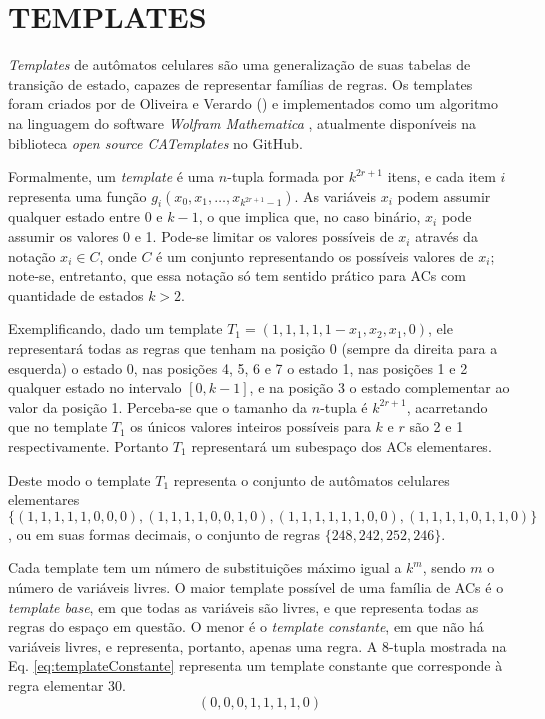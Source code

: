 \section{TEMPLATES}
\label{sec:templates}

\textit{Templates} de autômatos celulares são uma generalização de suas tabelas de transição de estado, capazes de representar famílias de regras. Os templates foram criados por de Oliveira e Verardo (\citeyear{deOliveira2014}) e implementados como um algoritmo na linguagem do software \textit{Wolfram Mathematica} \cite{woframMathematica10}, atualmente disponíveis na biblioteca \textit{open source CATemplates} \cite{CATemplates} no GitHub.

Formalmente, um \textit{template} é uma $n$-tupla formada por $k^{2r+1}$ itens, e cada item $i$ representa uma função $g_i(x_0,x_1,\dots,x_{k^{2r+1}-1})$. As variáveis $x_i$ podem assumir qualquer estado entre 0 e $k-1$, o que implica que, no caso binário, $x_i$ pode assumir os valores 0 e 1. Pode-se limitar os valores possíveis de $x_i$ através da notação $x_i \in C$, onde $C$ é um conjunto representando os possíveis valores de $x_i$; note-se, entretanto, que essa notação só tem sentido prático para ACs com quantidade de estados $k>2$.

Exemplificando, dado um template $T_1 = (1,1,1,1,1-x_1,x_2,x_1,0)$, ele representará todas as regras que tenham na posição 0 (sempre da direita para a esquerda) o estado 0, nas posições 4, 5, 6 e 7 o estado 1, nas posições 1 e 2 qualquer estado no intervalo $[0,k-1]$, e na posição 3 o estado complementar ao valor da posição 1. Perceba-se que o tamanho da $n$-tupla é $k^{2r+1}$, acarretando que no template $T_1$ os únicos valores inteiros possíveis para $k$ e $r$ são 2 e 1 respectivamente. Portanto $T_1$ representará um subespaço dos ACs elementares.

Deste modo o template $T_1$ representa o conjunto de autômatos celulares elementares $\{(1,1,1,1,1,0,0,0),(1,1,1,1,0,0,1,0),(1,1,1,1,1,1,0,0),(1,1,1,1,0,1,1,0)\}$, ou em suas formas decimais, o conjunto de regras $\{248,242,252,246\}$.

Cada template tem um número de substituições máximo igual a $k^m$, sendo $m$ o número de variáveis livres. O maior template possível de uma família de ACs é o \textit{template base}, em que todas as variáveis são livres, e que representa todas as regras do espaço em questão. O menor é o \textit{template constante}, em que não há variáveis livres, e representa, portanto, apenas uma regra. A $8$-tupla mostrada na Eq. \eqref{eq:templateConstante} representa um template constante que corresponde à regra elementar 30.  
\begin{equation}
(0,0,0,1,1,1,1,0)
\label{eq:templateConstante}
\end{equation}

